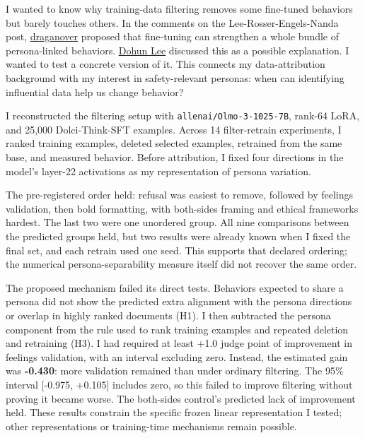 I wanted to know why training-data filtering removes some fine-tuned
behaviors but barely touches others. In the comments on the
Lee-Rosser-Engels-Nanda post,
\href{https://www.lesswrong.com/posts/aTybJ6CPQrxEY8rE2/data-filtering-works-a-lot-worse-than-you-would-expect?commentId=jmZwaZePbQJrtWvHS}{draganover}
proposed that fine-tuning can strengthen a whole bundle of
persona-linked behaviors.
\href{https://www.lesswrong.com/posts/aTybJ6CPQrxEY8rE2/data-filtering-works-a-lot-worse-than-you-would-expect?commentId=cqeJvGFmpmD66Hrer}{Dohun
Lee} discussed this as a possible explanation. I wanted to test a
concrete version of it. This connects my data-attribution background
with my interest in safety-relevant personas: when can identifying
influential data help us change behavior?

I reconstructed the filtering setup with
\texttt{allenai/Olmo-3-1025-7B}, rank-64 LoRA, and 25,000
Dolci-Think-SFT examples. Across 14 filter-retrain experiments, I ranked
training examples, deleted selected examples, retrained from the same
base, and measured behavior. Before attribution, I fixed four directions
in the model's layer-22 activations as my representation of persona
variation.

The pre-registered order held: refusal was easiest to remove, followed
by feelings validation, then bold formatting, with both-sides framing
and ethical frameworks hardest. The last two were one unordered group.
All nine comparisons between the predicted groups held, but two results
were already known when I fixed the final set, and each retrain used one
seed. This supports that declared ordering; the numerical
persona-separability measure itself did not recover the same order.

The proposed mechanism failed its direct tests. Behaviors expected to
share a persona did not show the predicted extra alignment with the
persona directions or overlap in highly ranked documents (H1). I then
subtracted the persona component from the rule used to rank training
examples and repeated deletion and retraining (H3). I had required at
least +1.0 judge point of improvement in feelings validation, with an
interval excluding zero. Instead, the estimated gain was
\textbf{-0.430}: more validation remained than under ordinary filtering.
The 95\% interval {[}-0.975, +0.105{]} includes zero, so this failed to
improve filtering without proving it became worse. The both-sides
control's predicted lack of improvement held. These results constrain
the specific frozen linear representation I tested; other
representations or training-time mechanisms remain possible.

